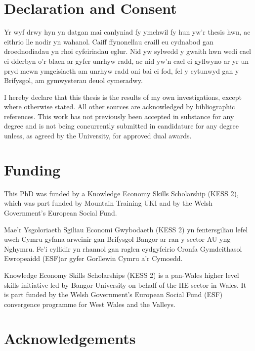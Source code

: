 \frontmatter

\section*{Declaration and Consent}

Yr wyf drwy hyn yn datgan mai canlyniad fy ymchwil fy hun yw’r thesis hwn, ac eithrio lle nodir yn wahanol. Caiff ffynonellau eraill eu cydnabod gan droednodiadau yn rhoi cyfeiriadau eglur. Nid yw sylwedd y gwaith hwn wedi cael ei dderbyn o’r blaen ar gyfer unrhyw radd, ac nid yw’n cael ei gyflwyno ar yr un pryd mewn ymgeisiaeth am unrhyw radd oni bai ei fod, fel y cytunwyd gan y Brifysgol, am gymwysterau deuol cymeradwy.

I hereby declare that this thesis is the results of my own investigations, except where otherwise stated.  All other sources are acknowledged by bibliographic references. This work has not previously been accepted in substance for any degree and is not being concurrently submitted in candidature for any degree unless, as agreed by the University, for approved dual awards.


\section*{Funding}

This PhD was funded by a Knowledge Economy Skills Scholarship (KESS 2), which was part funded by Mountain Training UKI and by the Welsh Government's European Social Fund.

Mae’r Ysgoloriaeth Sgiliau Economi Gwybodaeth (KESS 2) yn fentersgiliau lefel uwch Cymru gyfana arweinir gan Brifysgol Bangor ar ran y sector AU yng Nghymru. Fe’i cyllidir yn rhannol gan raglen cydgyfeirio Cronfa Gymdeithasol Ewropeaidd (ESF)ar gyfer Gorllewin Cymru a’r Cymoedd.

Knowledge Economy Skills Scholarships (KESS 2) is a pan-Wales higher level skills initiative led by Bangor University on behalf of the HE sector in Wales. It is part funded by the Welsh Government’s European Social Fund (ESF) convergence programme for West Wales and the Valleys.

\newpage

\section*{Acknowledgements}

